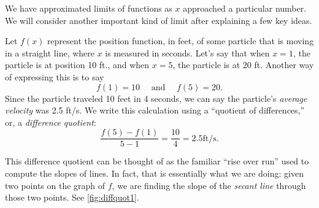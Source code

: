 
We have approximated limits of functions as $x$ approached a particular number. We will consider another important kind of limit after explaining a few key ideas.

Let $f(x)$ represent the position function, in feet, of some particle that is moving in a straight line, where $x$ is measured in seconds. Let's say that when $x=1$, the particle is at position 10 ft., and when $x=5$, the particle is at 20 ft. Another way of expressing this is to say
\[f(1)=10 \quad \text{ and } \quad f(5) = 20.\]
Since the particle traveled 10 feet in 4 seconds, we can say the particle's \textit{average velocity} was 2.5 ft/s. We write this calculation using a ``quotient of differences,'' or, a \textit{difference quotient}:
\[\frac{f(5) - f(1)}{5-1} = \frac{10}4 = 2.5 \text{ft/s}.\]

This difference quotient can be thought of as the familiar ``rise over run'' used to compute the slopes of lines. In fact, that is essentially what we are doing: given two points on the graph of $f$, we are finding the slope of the \textit{secant line} through those two points. See \autoref{fig:diffquot1}.

